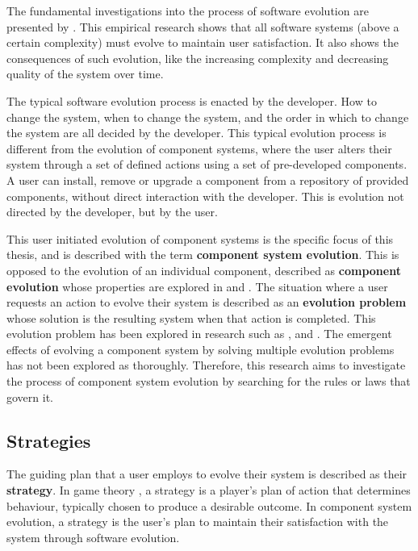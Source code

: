 The fundamental investigations into the process of software evolution are presented by \citep{lehman1980}.
This empirical research shows that all software systems (above a certain complexity) must evolve to maintain user satisfaction.
It also shows the consequences of such evolution, like the increasing complexity and decreasing quality of the system over time.

The typical software evolution process is enacted by the developer.
How to change the system, when to change the system, and the order in which to change the system are all decided by the developer.
This typical evolution process is different from the evolution of component systems, 
where the user alters their system through a set of defined actions using a set of pre-developed components.
A user can install, remove or upgrade a component from a repository of provided components, without direct interaction with the developer.
This is evolution not directed by the developer, but by the user. 

This user initiated evolution of component systems is the specific focus of this thesis, and is described with the term \textbf{component system evolution}.
This is opposed to the evolution of an individual component, described as \textbf{component evolution} whose properties are explored in \citep{vasa2007patterns} and \citep{Stuckenholz2005}.
The situation where a user requests an action to evolve their system is described as an \textbf{evolution problem} whose solution is the resulting system when that action is completed.
This evolution problem has been explored in research such as \citep{Ryan2005}, \citep{argelich2010solving} and \citep{di2010supporting}.
The emergent effects of evolving a component system by solving multiple evolution problems has not been explored as thoroughly.
Therefore, this research aims to investigate the process of component system evolution by searching for the rules or laws that govern it.

\subsection{Strategies}
The guiding plan that a user employs to evolve their system is described as their \textbf{strategy}.
In game theory \citep{rubinstein1991comments}, a strategy is a player's plan of action that determines behaviour, typically chosen to produce a desirable outcome.
In component system evolution, a strategy is the user's plan to maintain their satisfaction with the system through software evolution.

